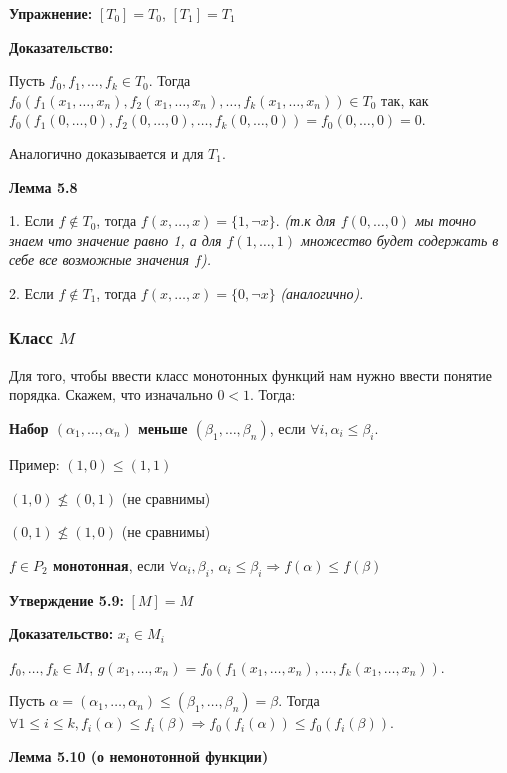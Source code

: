 \documentclass[openany]{article}
\begin{document}
   \textbf {Упражнение:} $[T_0] = T_0$, $[T_1] = T_1$

   \textbf {Доказательство:}

   Пусть $f_0, f_1, \ldots, f_k \in T_0$. Тогда $f_0 (f_1(x_1, \ldots, x_n), f_2(x_1, \ldots, x_n), \ldots, f_k(x_1, \ldots, x_n)) \in T_0$ так, как $f_0 (f_1 (0, \ldots, 0), f_2 (0, \ldots, 0), \ldots, f_k (0, \ldots, 0)) = f_0 (0, \ldots, 0) = 0$. 

   Аналогично доказывается и для $T_1$.

   \textbf {Лемма 5.8} 

   1. Если $f \notin T_0$, тогда $f (x, \ldots, x) = \{1, \neg x\}$. \textit{(т.к для $f (0, \ldots, 0)$ мы точно знаем что значение равно 1, а для $f (1, \ldots, 1)$ множество будет содержать в себе все возможные значения $f$).}

   2. Если $f \notin T_1$, тогда $f (x, \ldots, x) = \{0, \neg x\}$ \textit {(аналогично).}

   \subsubsection{Класс $M$}

   Для того, чтобы ввести класс монотонных функций нам нужно ввести понятие порядка. Скажем, что изначально $0 < 1$. Тогда:

   \textbf{Набор $(\alpha_1, \ldots, \alpha_n)$ меньше $(\beta_1, \ldots, \beta_n)$}, если $\forall i, \alpha_i \le \beta_i$.

   Пример: $(1, 0) \le (1, 1)$

   $(1, 0) \nleq (0, 1)$ (не сравнимы)

   $(0, 1) \nleq (1, 0)$ (не сравнимы)

   \textbf{$f \in P_2$ монотонная}, если $\forall \alpha_i, \beta_i$, $\alpha_i \le \beta_i \Rightarrow f(\alpha) \le f(\beta)$

   \textbf{Утверждение 5.9:} $[M] = M$

   \textbf{Доказательство:} $x_i \in M_i$

   $f_0, \ldots, f_k \in M$, $g(x_1, \ldots, x_n) = f_0(f_1(x_1, \ldots, x_n), \ldots, f_k(x_1, \ldots, x_n))$.

   Пусть $\alpha = (\alpha_1, \ldots, \alpha_n) \le (\beta_1, \ldots, \beta_n) = \beta$. Тогда $\forall 1 \le i \le k, f_i(\alpha) \le f_i(\beta) \Rightarrow f_0 ( f_i(\alpha) ) \le f_0 ( f_i (\beta) )$.

   \textbf{Лемма 5.10 (о немонотонной функции)}
\end{document}
